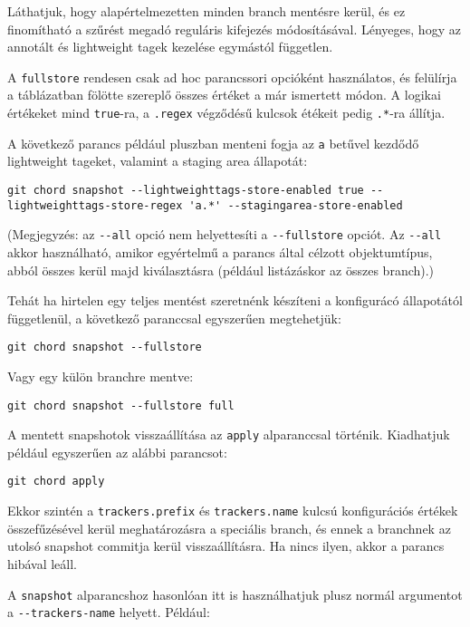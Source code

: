 \documentclass[
]{elteikthesis}[2025/03/25]
\begin{document}
Láthatjuk, hogy alapértelmezetten minden branch mentésre kerül,
és ez finomítható a szűrést megadó reguláris kifejezés módosításával.
Lényeges, hogy az annotált és lightweight tagek kezelése egymástól független.

A \verb|fullstore| rendesen csak ad hoc parancssori opcióként használatos,
és felülírja a táblázatban fölötte szereplő összes értéket a már ismertett módon.
A logikai értékeket mind \verb|true|-ra,
a \verb|.regex| végződésű kulcsok étékeit pedig \verb|.*|-ra állítja.

A következő parancs például pluszban menteni fogja az \verb|a| betűvel kezdődő lightweight tageket,
valamint a staging area állapotát:

\begin{verbatim}
git chord snapshot --lightweighttags-store-enabled true --lightweighttags-store-regex 'a.*' --stagingarea-store-enabled
\end{verbatim}

(Megjegyzés: az \verb|--all| opció nem helyettesíti a \verb|--fullstore| opciót.
Az \verb|--all| akkor használható, amikor egyértelmű a parancs által célzott objektumtípus,
abból összes kerül majd kiválasztásra
(például listázáskor az összes branch).)

Tehát ha hirtelen egy teljes mentést szeretnénk készíteni a konfigurácó állapotától függetlenül,
a következő paranccsal egyszerűen megtehetjük:

\begin{verbatim}
git chord snapshot --fullstore
\end{verbatim}

Vagy egy külön branchre mentve:

\begin{verbatim}
git chord snapshot --fullstore full
\end{verbatim}

A mentett snapshotok visszaállítása az \verb|apply| alparanccsal történik.
Kiadhatjuk például egyszerűen az alábbi parancsot:

\begin{verbatim}
git chord apply
\end{verbatim}

Ekkor szintén a \verb|trackers.prefix| és \verb|trackers.name| kulcsú konfigurációs értékek összefűzésével
kerül meghatározásra a speciális branch,
és ennek a branchnek az utolsó snapshot commitja kerül visszaállításra.
Ha nincs ilyen, akkor a parancs hibával leáll.

A \verb|snapshot| alparancshoz hasonlóan itt is használhatjuk plusz normál argumentot a \verb|--trackers-name| helyett.
Például:
\end{document}
